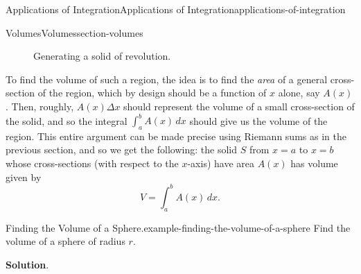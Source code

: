 \documentclass[oneside,10pt,]{book}
\numberwithin{equation}{section}
\begin{document}
\begin{chapterptx}{Applications of Integration}{}{Applications of Integration}{}{}{applications-of-integration}
\begin{sectionptx}{Volumes}{}{Volumes}{}{}{section-volumes}
\begin{figure}
\begin{sidebyside}{2}{0}{0}{0}
\begin{sbspanel}{0.5}
{{\begin{tikzpicture}
\end{tikzpicture}
}
}
\end{sbspanel}%
\begin{sbspanel}{0.5}%
\end{sbspanel}%
\end{sidebyside}%
\caption{Generating a solid of revolution.\label{figure-solid-revolution-1}}
\end{figure}
\hypertarget{p-629}{}%
To find the volume of such a region, the idea is to find the \emph{area} of a general cross-section of the region, which by design should be a function of \(x\) alone, say \(A(x)\). Then, roughly, \(A(x)\Delta x\) should represent the volume of a small cross-section of the solid, and so the integral \(\int_{a}^{b}A(x)\,dx\) should give us the volume of the region. This entire argument can be made precise using Riemann sums as in the previous section, and so we get the following: the solid \(S\) from \(x = a\) to \(x = b\) whose cross-sections (with respect to the \(x\)-axis) have area \(A(x)\) has volume given by%
\begin{equation}
V = \int_{a}^{b}A(x)\,dx.\label{equation-solid-revolution-volume}
\end{equation}
%
\begin{example}{Finding the Volume of a Sphere.}{example-finding-the-volume-of-a-sphere}%
\hypertarget{p-630}{}%
Find the volume of a sphere of radius \(r\).%
\par\smallskip%
\noindent\textbf{Solution}.\hypertarget{solution-137}{}\quad%

\end{example}
\end{sectionptx}
\end{chapterptx}
\end{document}
